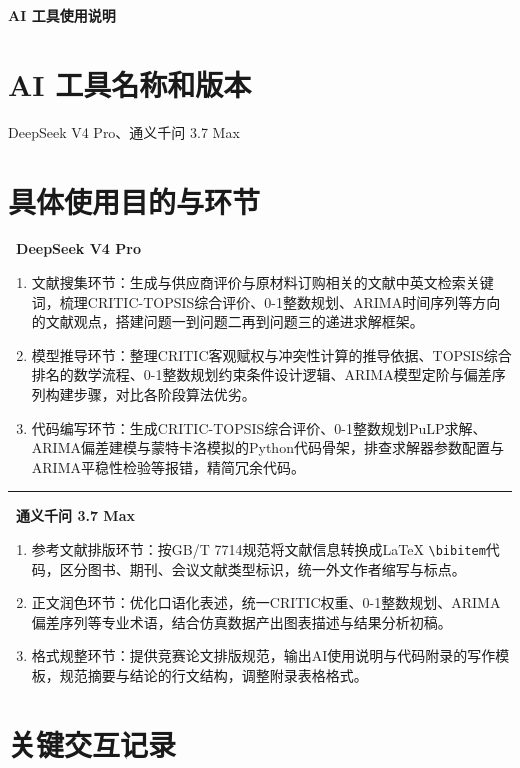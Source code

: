 \documentclass[12pt,a4paper]{ctexart}
\begin{document}
\begin{center}
{\heiti\bfseries AI 工具使用说明}
\end{center}

\section{AI 工具名称和版本}

DeepSeek V4 Pro、通义千问 3.7 Max

\section{具体使用目的与环节}

\noindent\textbf{\textbullet~DeepSeek V4 Pro}

\begin{enumerate}[label=(\arabic*)]
  \item 文献搜集环节：生成与供应商评价与原材料订购相关的文献中英文检索关键词，梳理CRITIC-TOPSIS综合评价、0-1整数规划、ARIMA时间序列等方向的文献观点，搭建问题一到问题二再到问题三的递进求解框架。
  \item 模型推导环节：整理CRITIC客观赋权与冲突性计算的推导依据、TOPSIS综合排名的数学流程、0-1整数规划约束条件设计逻辑、ARIMA模型定阶与偏差序列构建步骤，对比各阶段算法优劣。
  \item 代码编写环节：生成CRITIC-TOPSIS综合评价、0-1整数规划PuLP求解、ARIMA偏差建模与蒙特卡洛模拟的Python代码骨架，排查求解器参数配置与ARIMA平稳性检验等报错，精简冗余代码。
\end{enumerate}

\noindent\rule{\linewidth}{0.4pt}

\noindent\textbf{\textbullet~通义千问 3.7 Max}

\begin{enumerate}[label=(\arabic*)]
  \item 参考文献排版环节：按GB/T 7714规范将文献信息转换成LaTeX \verb|\bibitem|代码，区分图书、期刊、会议文献类型标识，统一外文作者缩写与标点。
  \item 正文润色环节：优化口语化表述，统一CRITIC权重、0-1整数规划、ARIMA偏差序列等专业术语，结合仿真数据产出图表描述与结果分析初稿。
  \item 格式规整环节：提供竞赛论文排版规范，输出AI使用说明与代码附录的写作模板，规范摘要与结论的行文结构，调整附录表格格式。
\end{enumerate}

\section{关键交互记录}
\end{document}
